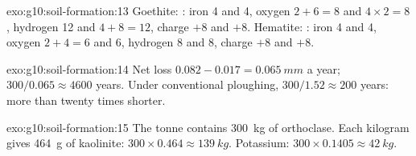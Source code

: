 \begin{solution}{exo:g10:soil-formation:13}
Goethite: : iron 4 and 4,
oxygen $2 + 6 = 8$ and $4 \times 2 = 8$, hydrogen 12 and $4 + 8 = 12$, charge
$+8$ and $+8$. Hematite: : iron 4
and 4, oxygen $2 + 4 = 6$ and 6, hydrogen 8 and 8, charge $+8$ and $+8$.
\end{solution}

\begin{solution}{exo:g10:soil-formation:14}
Net loss $0.082 - 0.017 = \qty{0.065}{mm}$ a year; $300/0.065 \approx 4600$
years. Under conventional ploughing, $300/1.52 \approx 200$ years: more than
twenty times shorter.
\end{solution}

\begin{solution}{exo:g10:soil-formation:15}
The tonne contains \qty{300}{kg} of orthoclase. Each kilogram gives
\qty{464}{g} of kaolinite: $300 \times 0.464 \approx \qty{139}{kg}$. Potassium:
$300 \times 0.1405 \approx \qty{42}{kg}$.
\end{solution}

